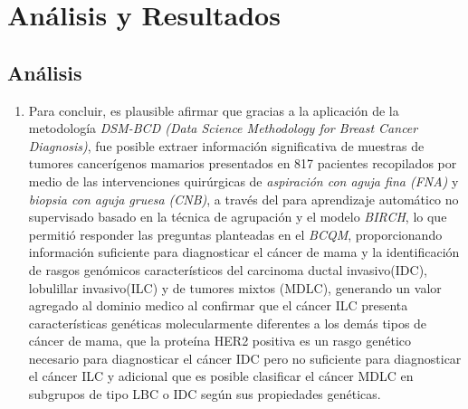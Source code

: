 \chapter{Análisis y Resultados}

\section{Análisis}
\begin{enumerate}[label=\HandPencilLeft]
	\item Para concluir, es plausible afirmar que gracias a la aplicación de la metodología \textit{DSM-BCD (Data Science Methodology for Breast Cancer Diagnosis)}, fue posible extraer información significativa de muestras de tumores cancerígenos mamarios presentados en 817 pacientes recopilados por medio de las intervenciones quirúrgicas de \textit{aspiración con aguja fina (FNA)} y \textit{biopsia con aguja gruesa (CNB)}, a través del para aprendizaje automático no supervisado basado en la técnica de agrupación y el modelo \textit{BIRCH}, lo que permitió responder las preguntas planteadas en el \textit{BCQM}, proporcionando información suficiente para diagnosticar el cáncer de mama y la identificación de  rasgos genómicos característicos del carcinoma ductal invasivo(IDC), lobulillar invasivo(ILC) y de tumores mixtos (MDLC), generando un valor agregado al dominio medico al confirmar que el cáncer ILC presenta características genéticas molecularmente diferentes a los demás tipos de cáncer de mama, que  la proteína HER2 positiva es un rasgo genético necesario para diagnosticar el cáncer IDC pero no suficiente para diagnosticar el cáncer ILC y adicional que es posible clasificar el cáncer MDLC en subgrupos de tipo LBC o IDC según sus propiedades genéticas.
\end{enumerate}

\newpage
